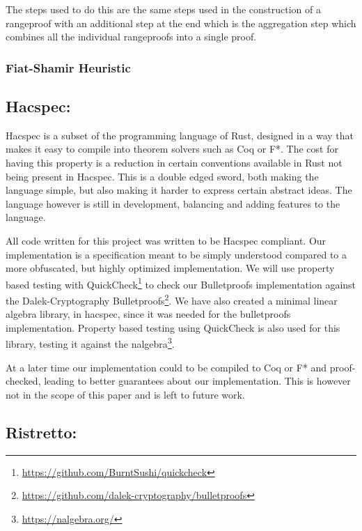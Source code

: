 \documentclass{article}
\begin{document}
The steps used to do this are the same steps used in the construction of a rangeproof with an additional step at the end which is the aggregation step which combines all the individual rangeproofs into a single proof.

\subsubsection{Fiat-Shamir Heuristic}\label{fiat-shamir-heuristic}

\subsection{Hacspec:} \label{Hacspec}

Hacspec is a subset of the programming language of Rust, designed in a
way that makes it easy to compile into theorem solvers such as Coq or F*.
The cost for having this property is a reduction in certain conventions
available in Rust not being present in Hacspec. This is a double edged
sword, both making the language simple, but also making it harder to
express certain abstract ideas. The language however is still in
development, balancing and adding features to the language.

All code written for this project was written to be Hacspec
compliant.  Our implementation is a specification meant to
be simply understood compared to a more obfuscated, but highly
optimized implementation. We will use property based testing with
QuickCheck\footnote{\url{https://github.com/BurntSushi/quickcheck}}
to check our Bulletproofs implementation against the Dalek-Cryptography
Bulletproofs\footnote{\url{https://github.com/dalek-cryptography/bulletproofs}}.
We have also created a minimal linear algebra library, in hacspec,
since it was needed for the bulletproofs implementation. Property
based testing using QuickCheck is also used for this library, testing
it against the nalgebra\footnote{\url{https://nalgebra.org/}}.

At a later time our implementation could to be compiled to Coq or F* and
proof-checked, leading to better guarantees about our implementation.
This is however not in the scope of this paper and is left to future
work. %

\subsection{Ristretto:} \label{ristretto}
\end{document}

